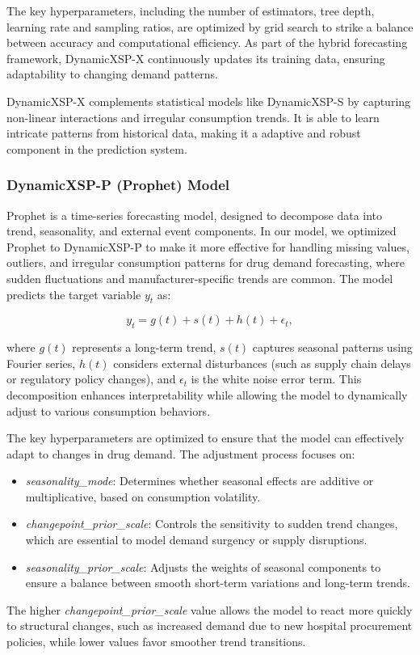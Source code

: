 \documentclass[journal]{IEEEtran}
\begin{document}
The key hyperparameters, including the number of estimators, tree depth, learning rate and sampling ratios, are optimized by grid search to strike a balance between accuracy and computational efficiency. As part of the hybrid forecasting framework, DynamicXSP-X continuously updates its training data, ensuring adaptability to changing demand patterns.

DynamicXSP-X complements statistical models like DynamicXSP-S by capturing non-linear interactions and irregular consumption trends. It is able to learn intricate patterns from historical data, making it a adaptive and robust component in the prediction system.

\subsubsection{DynamicXSP-P (Prophet) Model}

Prophet is a time-series forecasting model, designed to decompose data into trend, seasonality, and external event components. In our model, we optimized Prophet to DynamicXSP-P to make it more effective for handling missing values, outliers, and irregular consumption patterns for drug demand forecasting, where sudden fluctuations and manufacturer-specific trends are common. The model predicts the target variable \(y_t\) as:

\begin{equation}
y_{t} = g(t) + s(t) + h(t) + \epsilon_{t},
\end{equation}

where \(g(t)\) represents a long-term trend, \(s(t)\) captures seasonal patterns using Fourier series, \(h(t)\) considers external disturbances (such as supply chain delays or regulatory policy changes), and \(\epsilon_{t}\) is the white noise error term. This decomposition enhances interpretability while allowing the model to dynamically adjust to various consumption behaviors.

The key hyperparameters are optimized to ensure that the model can effectively adapt to changes in drug demand. The adjustment process focuses on:
\begin{itemize}
    \item \textit{seasonality\_mode}: Determines whether seasonal effects are additive or multiplicative, based on consumption volatility.
    \item \textit{changepoint\_prior\_scale}: Controls the sensitivity to sudden trend changes, which are essential to model demand surgency or supply disruptions.
    \item \textit{seasonality\_prior\_scale}: Adjusts the weights of seasonal components to ensure a balance between smooth short-term variations and long-term trends.
\end{itemize}
The higher \textit{changepoint\_prior\_scale} value allows the model to react more quickly to structural changes, such as increased demand due to new hospital procurement policies, while lower values favor smoother trend transitions.
\end{document}
